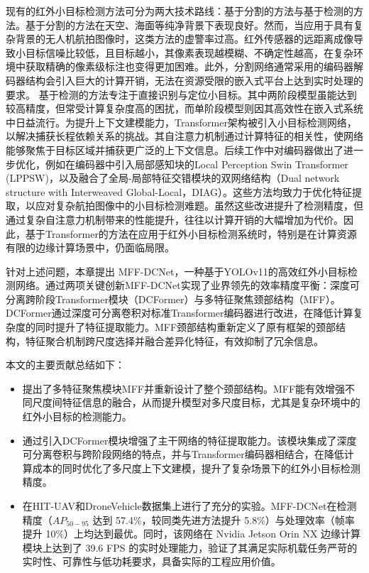 现有的红外小目标检测方法可分为两大技术路线：基于分割的方法与基于检测的方法。基于分割的方法在天空、海面等纯净背景下表现良好\cite{Kou2023survey}。然而，当应用于具有复杂背景的无人机航拍图像时，这类方法的虚警率过高。红外传感器的远距离成像导致小目标信噪比较低，且目标越小，其像素表现越模糊、不确定性越高，在复杂环境中获取精确的像素级标注也变得更加困难。此外，分割网络通常采用的编码器解码器结构会引入巨大的计算开销，无法在资源受限的嵌入式平台上达到实时处理的要求。 
基于检测的方法专注于直接识别与定位小目标。其中两阶段模型虽能达到较高精度，但常受计算复杂度高的困扰\cite{Tong2022survey}，而单阶段模型则因其高效性在嵌入式系统中日益流行。为提升上下文建模能力，Transformer架构\cite{Liu2021SwinTH,Dosovitskiy2020ViT}被引入小目标检测网络，以解决捕获长程依赖关系的挑战。其自注意力机制通过计算特征的相关性，使网络能够聚焦于目标区域并捕获更广泛的上下文信息。后续工作中对编码器做出了进一步优化，例如在编码器中引入局部感知块的Local Perception Swin Transformer (LPPSW)\cite{Xu2021LPPSW}，以及融合了全局-局部特征交错模块的双网络结构（Dual network structure with Interweaved Global-Local，DIAG）\cite{Xue2022DIAG}。这些方法均致力于优化特征提取，以应对复杂航拍图像中的小目标检测难题。虽然这些改进提升了检测精度，但通过复杂自注意力机制带来的性能提升，往往以计算开销的大幅增加为代价。因此，基于Transformer的方法在应用于红外小目标检测系统时，特别是在计算资源有限的边缘计算场景中，仍面临局限。

针对上述问题，本章提出 MFF-DCNet，一种基于YOLOv11的高效红外小目标检测网络。通过两项关键创新MFF-DCNet实现了业界领先的效率精度平衡：深度可分离跨阶段Transformer模块（DCFormer）与多特征聚焦颈部结构（MFF）。DCFormer通过深度可分离卷积对标准Transformer编码器进行改进，在降低计算复杂度的同时提升了特征提取能力。MFF颈部结构重新定义了原有框架的颈部结构，特征聚合机制跨尺度选择并融合差异化特征，有效抑制了冗余信息。

本文的主要贡献总结如下：
\begin{itemize}
\item 提出了多特征聚焦模块MFF并重新设计了整个颈部结构。MFF能有效增强不同尺度间特征信息的融合，从而提升模型对多尺度目标，尤其是复杂环境中的红外小目标的检测能力。

\item 通过引入DCFormer模块增强了主干网络的特征提取能力。该模块集成了深度可分离卷积与跨阶段网络的特点，并与Transformer编码器相结合，在降低计算成本的同时优化了多尺度上下文建模，提升了复杂场景下的红外小目标检测精度。

\item 在HIT-UAV\cite{Suo2023HIT-UAV}和DroneVehicle\cite{Sun2022DroneVehicle}数据集上进行了充分的实验。MFF-DCNet在检测精度（$AP_{50-95}$ 达到 57.4\%，较同类先进方法提升 5.8\%）与处理效率（帧率提升 10\%）上均达到最优。同时，该网络在 Nvidia Jetson Orin NX 边缘计算模块上达到了 39.6 FPS 的实时处理能力，验证了其满足实际机载任务严苛的实时性、可靠性与低功耗要求，具备实际的工程应用价值。
\end{itemize}

